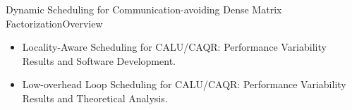 \begin{frame}{Dynamic Scheduling for Communication-avoiding Dense Matrix Factorization}{Overview}
\begin{itemize}
\item Locality-Aware Scheduling for CALU/CAQR: Performance Variability Results and Software Development.
\item Low-overhead Loop Scheduling for CALU/CAQR: Performance Variability Results and Theoretical Analysis.
\end{itemize}
\end{frame}
